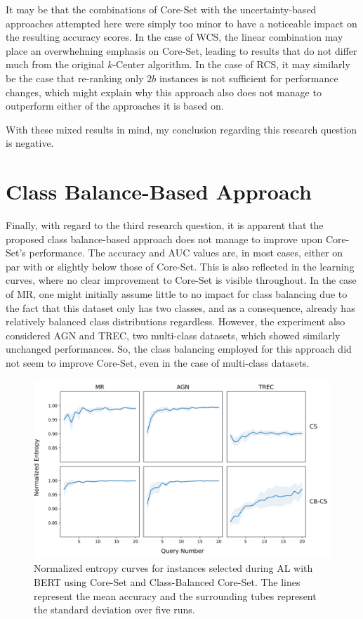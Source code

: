 \documentclass[english,bachelor,ul]{webisthesis} %
\begin{document}
It may be that the combinations of Core-Set with the uncertainty-based approaches attempted here were simply too minor to have a noticeable impact on the resulting accuracy scores. In the case of WCS, the linear combination may place an overwhelming emphasis on Core-Set, leading to results that do not differ much from the original $k$-Center algorithm. In the case of RCS, it may similarly be the case that re-ranking only $2b$ instances is not sufficient for performance changes, which might explain why this approach also does not manage to outperform either of the approaches it is based on.

With these mixed results in mind, my conclusion regarding this research question is negative.

\section{Class Balance-Based Approach}

Finally, with regard to the third research question, it is apparent that the proposed class balance-based approach does not manage to improve upon Core-Set's performance. The accuracy and AUC values are, in most cases, either on par with or slightly below those of Core-Set. This is also reflected in the learning curves, where no clear improvement to Core-Set is visible throughout. In the case of MR, one might initially assume little to no impact for class balancing due to the fact that this dataset only has two classes, and as a consequence, already has relatively balanced class distributions regardless. However, the experiment also considered AGN and TREC, two multi-class datasets, which showed similarly unchanged performances. So, the class balancing employed for this approach did not seem to improve Core-Set, even in the case of multi-class datasets.

\begin{figure}[htbp]
    \centering
    \includegraphics[scale=0.55]{img/entropy_plots_new-1.png}
    \caption{Normalized entropy curves for instances selected during AL with BERT using Core-Set and Class-Balanced Core-Set. The lines represent the mean accuracy and the surrounding tubes represent the standard deviation over five runs.}
    \label{fig:entropy-plot}
\end{figure}
\end{document}
